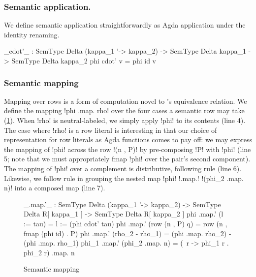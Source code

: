 \documentclass[sigplan,10pt,anonymous,review]{acmart}\settopmatter{printfolios=true,printccs=false,printacmref=false}
\begin{document}
\subsubsection{Semantic application.}

We define semantic application straightforwardly as Agda application under the identity renaming.

\begin{agda}
_cdot'_ : SemType Delta (kappa_1 '-> kappa_2) -> 
          SemType Delta kappa_1 -> 
          SemType Delta kappa_2
phi cdot' v = phi id v
\end{agda}

\subsubsection{Semantic mapping}
Mapping over rows is a form of computation novel to \Rome's equivalence relation. We define the mapping !phi .map. rho! over the four cases a semantic row may take (\cref{fig:semantic-mapping}). When !rho! is neutral-labeled, we simply apply !phi! to its contents (line 4). The case where !rho! is a row literal is interesting in that our choice of representation for row literals as Agda functions comes to pay off: we may express the mapping of !phi! across the row !(n , P)! by pre-composing !P! with !phi! (line 5; note that we must appropriately fmap !phi! over the pair's second component). The mapping of !phi! over a complement is distributive, following rule  (line 6). Likewise, we follow rule  in grouping the nested map !phi! !.map.! !(phi_2 .map. n)! into a composed map (line 7).

\begin{figure}
\begin{agda}
_.map.'_ : SemType Delta (kappa_1 '-> kappa_2) -> 
           SemType Delta R[ kappa_1 ] -> 
           SemType Delta R[ kappa_2 ]
phi .map.' (l := tau) = l := (phi cdot' tau)
phi .map.' (row (n , P) q) = row (n , fmap (phi id) . P)
phi .map.' (rho_2 - rho_1) = (phi .map. rho_2) - (phi .map. rho_1)
phi_1 .map.' (phi_2 .map. n) = (\ r -> phi_1 r . phi_2 r) .map. n
\end{agda}
\caption{Semantic mapping}
\label{fig:semantic-mapping}
\end{figure}
\end{document}
